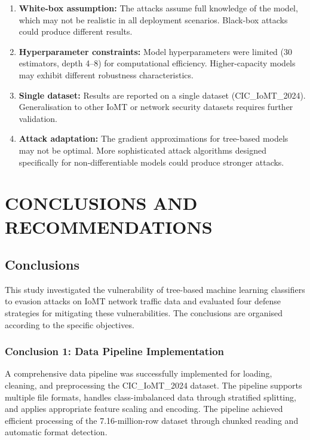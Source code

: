 \documentclass[12pt,a4paper,oneside]{report}
\begin{document}
\begin{enumerate}
    \item \textbf{White-box assumption:} The attacks assume full knowledge of the model, which may not be realistic in all deployment scenarios. Black-box attacks could produce different results.
    \item \textbf{Hyperparameter constraints:} Model hyperparameters were limited (30 estimators, depth 4--8) for computational efficiency. Higher-capacity models may exhibit different robustness characteristics.
    \item \textbf{Single dataset:} Results are reported on a single dataset (CIC\_IoMT\_2024). Generalisation to other IoMT or network security datasets requires further validation.
    \item \textbf{Attack adaptation:} The gradient approximations for tree-based models may not be optimal. More sophisticated attack algorithms designed specifically for non-differentiable models could produce stronger attacks.
\end{enumerate}


\chapter{CONCLUSIONS AND RECOMMENDATIONS}

\section{Conclusions}

This study investigated the vulnerability of tree-based machine learning classifiers to evasion attacks on IoMT network traffic data and evaluated four defense strategies for mitigating these vulnerabilities. The conclusions are organised according to the specific objectives.

\subsection{Conclusion 1: Data Pipeline Implementation}

A comprehensive data pipeline was successfully implemented for loading, cleaning, and preprocessing the CIC\_IoMT\_2024 dataset. The pipeline supports multiple file formats, handles class-imbalanced data through stratified splitting, and applies appropriate feature scaling and encoding. The pipeline achieved efficient processing of the 7.16-million-row dataset through chunked reading and automatic format detection.
\end{document}
